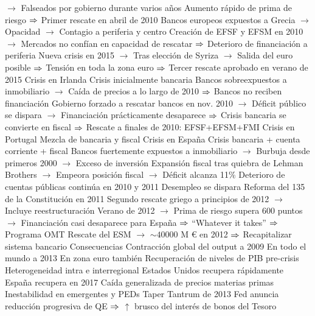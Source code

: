 \documentclass{nuevotema}
\begin{document}
\begin{esquemal}
				\4[] $\to$ Falseados por gobierno durante varios años
				\4[] Aumento rápido de prima de riesgo
				\4[] $\Rightarrow$ Primer rescate en abril de 2010
				\4[] Bancos europeos expuestos a Grecia
				\4[] $\to$ Opacidad
				\4[] $\to$ Contagio a periferia y centro
				\4[] Creación de EFSF y EFSM en 2010
				\4[] $\to$ Mercados no confían en capacidad de rescatar
				\4[] $\Rightarrow$ Deterioro de financiación a periferia
				\4[] Nueva crisis en 2015
				\4[] $\to$ Tras elección de Syriza
				\4[] $\to$ Salida del euro posible
				\4[] $\Rightarrow$ Tensión en toda la zona euro
				\4[] $\Rightarrow$ Tercer rescate aprobado en verano de 2015
				\4 Crisis en Irlanda
				\4[] Crisis inicialmente bancaria
				\4[] Bancos sobreexpuestos a inmobiliario
				\4[] $\to$ Caída de precios a lo largo de 2010
				\4[] $\Rightarrow$ Bancos no reciben financiación
				\4[] Gobierno forzado a rescatar bancos en nov. 2010
				\4[] $\to$ Déficit público se dispara
				\4[] $\to$ Financiación prácticamente desaparece
				\4[] $\Rightarrow$ Crisis bancaria se convierte en fiscal
				\4[] $\Rightarrow$ Rescate a finales de 2010: EFSF+EFSM+FMI
				\4 Crisis en Portugal
				\4[] Mezcla de bancaria y fiscal
				\4 Crisis en España
				\4[] Crisis bancaria + cuenta corriente + fiscal
				\4[] Bancos fuertemente expuestos a inmobiliario
				\4[] $\to$ Burbuja desde primeros 2000
				\4[] $\to$ Exceso de inversión
				\4[] Expansión fiscal tras quiebra de Lehman Brothers
				\4[] $\to$ Empeora posición fiscal
				\4[] $\to$ Déficit alcanza 11\%
				\4[] Deterioro de cuentas públicas continúa en 2010 y 2011
				\4[] Desempleo se dispara
				\4[] Reforma del 135 de la Constitución en 2011
				\4[] Segundo rescate griego a principios de 2012
				\4[] $\to$ Incluye reestructuración
				\4[] Verano de 2012
				\4[] $\to$ Prima de riesgo supera 600 puntos
				\4[] $\to$ Financiación casi desaparece para España
				\4[] $\Rightarrow$ ``Whatever it takes''
				\4[] $\Rightarrow$ Programa OMT
				\4[] Rescate del ESM
				\4[] $\to$ $\sim 40000$ M € en 2012
				\4[] $\Rightarrow$ Recapitalizar sistema bancario
		\2 Consecuencias
			\3 Contracción global del output
				 a 2009
				\4[] En todo el mundo
				 a 2013
				\4[] En zona euro también
				\4 Recuperación de niveles de PIB pre-crisis
				\4[] Heterogeneidad intra e interregional
				\4[] Estados Unidos recupera rápidamente
				\4[] España recupera en 2017
				\4 Caída generalizada de precios materias primas
				\4[] Inestabilidad en emergentes y PEDs
				\4 Taper Tantrum de 2013
				\4[] Fed anuncia reducción progresiva de QE
				\4[] $\Rightarrow$ $\uparrow$ brusco del interés de bonos del Tesoro

\end{esquemal}
\end{document}
